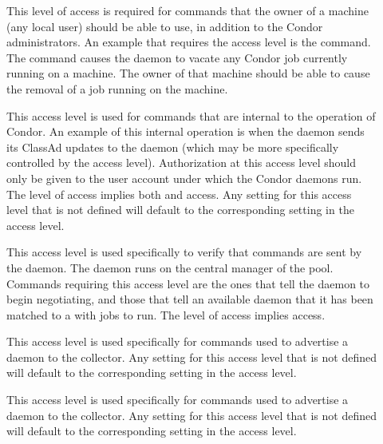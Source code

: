 \begin{description}
\item[] \label{sec-level-owner} This level of access is
   required for commands that the owner of a machine (any local user)
   should be able to use, in addition to the Condor administrators.
   An example that requires the  access level is
   the  command.
   The command causes the  daemon to vacate any
   Condor job currently running on a machine.
   The owner of that machine should be able to cause the removal
   of a job running on the machine.

\item[] \label{sec-level-daemon} This access level
   is used for commands that are internal to the operation of
   Condor.  An example of this internal operation is when the
    daemon sends
   its ClassAd updates to the  daemon (which may be
   more specifically controlled by the 
   access level).
   Authorization at this access level should only be given to
   the user account under which the Condor daemons run.
   The  level of access implies both
    and  access.  Any setting for this access
   level that is not defined will default to the corresponding setting
   in the  access level.

\item[] \label{sec-level-negotiator} This 
   access level is used specifically to verify that commands are
   sent by the  daemon.
   The  daemon runs on the central manager of
   the pool.
   Commands requiring this access
   level are the ones that tell the  daemon to begin
   negotiating, and those that tell an available  daemon
   that it has been matched to a  with jobs to run.
   The  level of access implies  access. 

\item[] \label{sec-level-advertise-master} This
   access level is used specifically for commands used to advertise a
    daemon to the collector.  Any setting for this access
   level that is not defined will default to the corresponding setting
   in the  access level.

\item[] \label{sec-level-advertise-master} This
   access level is used specifically for commands used to advertise a
    daemon to the collector.  Any setting for this access
   level that is not defined will default to the corresponding setting
   in the  access level.


\end{description}
